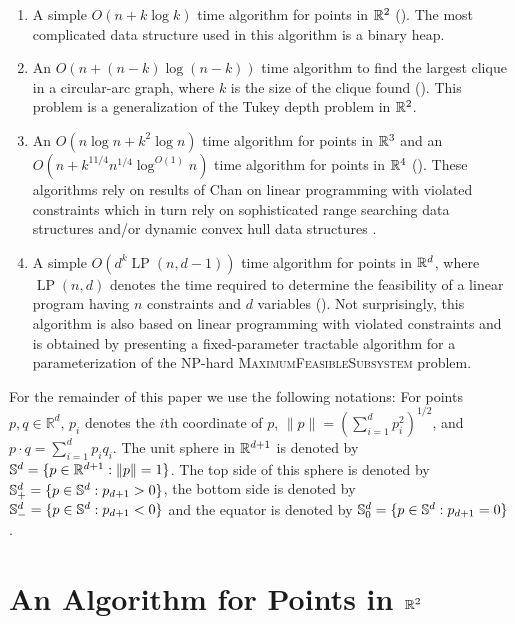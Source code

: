 \documentclass[charterfonts,lotsofwhite]{patmorin}
\DeclareMathOperator{\lp}{LP}
\begin{document}
\begin{enumerate}
\item A simple $O(n + k\log k)$ time algorithm for points in $\mathbb{R}^2$
().  The most complicated data structure used in this
algorithm is a binary heap.

\item An $O(n + (n-k)\log(n-k))$ time algorithm to find the largest
clique in a circular-arc graph, where $k$ is the size of the clique
found ().  This problem is a generalization of the
Tukey depth problem in $\mathbb{R}^2$.

\item An $O(n\log n + k^2\log n)$ time algorithm for points in $\mathbb{R}^3$
and an $O(n + k^{11/4}n^{1/4}\log^{O(1)}n)$ time algorithm for points
in $\mathbb{R}^4$ ().  These algorithms rely on results of Chan
on linear programming with violated constraints \cite{c05} which in
turn rely on sophisticated range searching data structures
\cite{m92,r99} and/or dynamic convex hull data structures \cite{bj02}.

\item A simple $O(d^k \lp(n,d-1))$ time algorithm for points in
$\mathbb{R}^d$, where $\lp(n,d)$ denotes the time required to determine the
feasibility of a linear program having $n$ constraints and $d$
variables ().  Not surprisingly, this algorithm is also
based on linear programming with violated constraints and is obtained
by presenting a fixed-parameter tractable algorithm for a
parameterization of the NP-hard \textsc{MaximumFeasibleSubsystem}
problem.
\end{enumerate}

For the remainder of this paper we use the following notations: For
points $p,q\in\mathbb{R}^d$, $p_i$ denotes the $i$th coordinate of
$p$, $\|p\|=(\sum_{i=1}^d p_i^2)^{1/2}$, and $p\cdot
q=\sum_{i=1}^d p_iq_i$.  The unit sphere in $\mathbb{R}^{d+1}$ is denoted by
$\mathbb{S}^d =\{ p\in\mathbb{R}^{d+1} : \|p\|=1\}$. The top side of this sphere is
denoted by $\mathbb{S}^d_+ =\{ p\in\mathbb{S}^{d} : p_{d+1} > 0 \}$, the bottom
side is denoted by $\mathbb{S}^d_- =\{ p\in\mathbb{S}^{d} : p_{d+1} < 0 \}$ and the
equator is denoted by $\mathbb{S}^d_0 =\{ p\in\mathbb{S}^{d} : p_{d+1} = 0 \}$ .



\section{An Algorithm for Points in $\mathbb{R}^2$}
\end{document}
